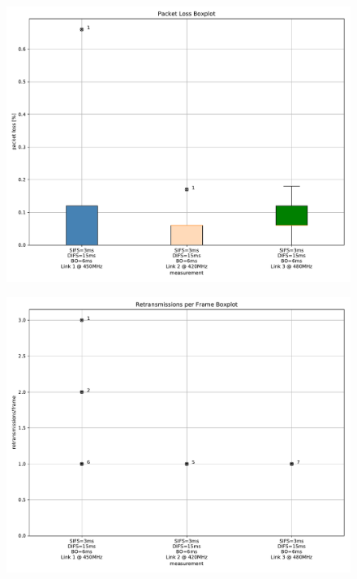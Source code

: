 \documentclass{article}
\begin{document}
\begin{figure}
	\includegraphics[width=\textwidth]{rb_single/boxplot/packet_loss_boxplot}
\end{figure}

\begin{figure}
	\includegraphics[width=\textwidth]{rb_single/boxplot/retransmissions_per_frame_boxplot}
\end{figure}
\end{document}
